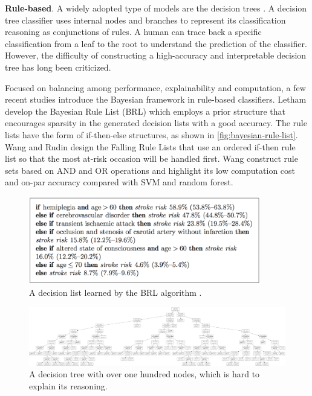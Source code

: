 \textbf{Rule-based}. A widely adopted type of models are the decision trees \cite{breiman1984classificationtree}. A decision tree classifier uses internal nodes and branches to represent its classification reasoning as conjunctions of rules. A human can trace back a specific classification from a leaf to the root to understand the prediction of the classifier. However, the difficulty of constructing a high-accuracy and interpretable decision tree has long been criticized. 

Focused on balancing among performance, explainability and computation, a few recent studies introduce the Bayesian framework in rule-based classifiers. Letham \etal \cite{letham2015stroke} develop the Bayesian Rule List (BRL) which employs a prior structure that encourages sparsity in the generated decision lists with a good accuracy. The rule lists have the form of if-then-else structures, as shown in \autoref{fig:bayesian-rule-list}. Wang and Rudin \cite{wang2015falling} design the Falling Rule Lists that use an ordered if-then rule list so that the most at-risk occasion will be handled first. Wang \etal \cite{wang2017rulesets} construct rule sets based on AND and OR operations and highlight its low computation cost and on-par accuracy compared with SVM and random forest.


\begin{figure}[tb]
  \centering
  \includegraphics[width=0.9\textwidth]{figure/bayesian-rule-list}
  \caption{A decision list learned by the BRL algorithm \cite{letham2015stroke}.}
  \label{fig:bayesian-rule-list}
\end{figure}

\begin{figure}[tb]
  \centering
  \includegraphics[width=1.0\textwidth]{figure/huge-tree}
  \caption{A decision tree with over one hundred nodes, which is hard to explain its reasoning.}
  \label{fig:huge-tree}
\end{figure}

